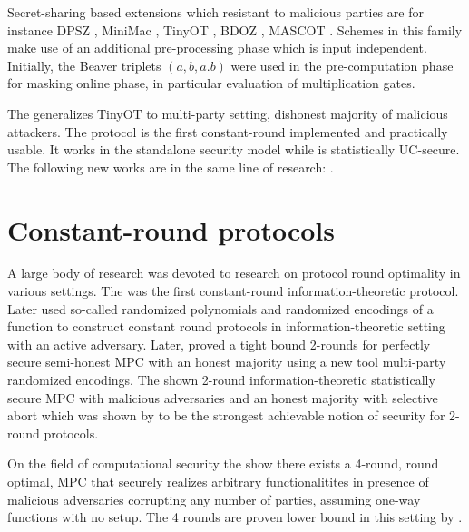 \documentclass[
  digital, %
  twoside, %
  table,   %
  lof,     %
  lot,     %
]{fithesis3}
\theoremstyle{definition}
\theoremstyle{remark}
\begin{document}
Secret-sharing based extensions which resistant to malicious parties are for instance DPSZ \cite{DPSZ12, cryptoeprint:2012:642}, MiniMac \cite{DZ13}, TinyOT \cite{NNOB12}, BDOZ \cite{BDOZ11}, MASCOT \cite{KOS16}. Schemes in this family make use of an additional pre-processing phase which is input independent. Initially, the Beaver triplets \cite{B91a} $(a,b,a.b)$ were used in the pre-computation phase for masking online phase, in particular evaluation of multiplication gates.

The \cite{WRK17} generalizes TinyOT to multi-party setting, dishonest majority of malicious attackers. The protocol is the first constant-round implemented and practically usable. It works in the standalone security model while \cite{DPSZ12} is statistically UC-secure. The following new works are in the same line of research: \cite{FKOS15, DZ16, LPJ17, BCGIM17, cryptoeprint:2017:1230}.
%

\section{Constant-round protocols}\label{sec:soa:const_rounds}%
A large body of research was devoted to research on protocol round optimality in various settings. The \cite{BB89} was the first constant-round information-theoretic protocol. Later \cite{IK00, IK02} used so-called randomized polynomials and randomized encodings \cite{AIK04} of a function to construct constant round protocols in information-theoretic setting with an active adversary. Later, \cite{ABT18} proved a tight bound 2-rounds for perfectly secure semi-honest MPC with an honest majority using a new tool multi-party randomized encodings. The \cite{cryptoeprint:2018:1078} shown 2-round information-theoretic statistically secure MPC with malicious adversaries and an honest majority with selective abort which was shown by \cite{GIKR04} to be the strongest achievable notion of security for 2-round protocols.

On the field of computational security the \cite{cryptoeprint:2017:1056} show there exists a 4-round, round optimal, MPC that securely realizes arbitrary functionalitites in presence of malicious adversaries corrupting any number of parties, assuming one-way functions with no setup. The 4 rounds are proven lower bound in this setting by \cite{cryptoeprint:2016:252}.
\end{document}
